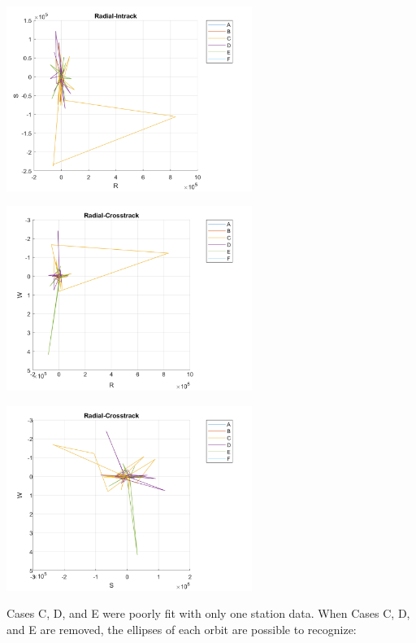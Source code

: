 \documentclass[conf]{new-aiaa}
\begin{document}
\begin{center}
\includegraphics[width=0.6\textwidth]{radial-intrack.png}

\includegraphics[width=0.6\textwidth]{radial-crosstrack.png}

\includegraphics[width=0.6\textwidth]{intrack-crosstrack.png}
\end{center}

Cases C, D, and E were poorly fit with only one station data. When Cases C, D, and E are removed, the ellipses of each orbit are possible to recognize:  
\end{document}
